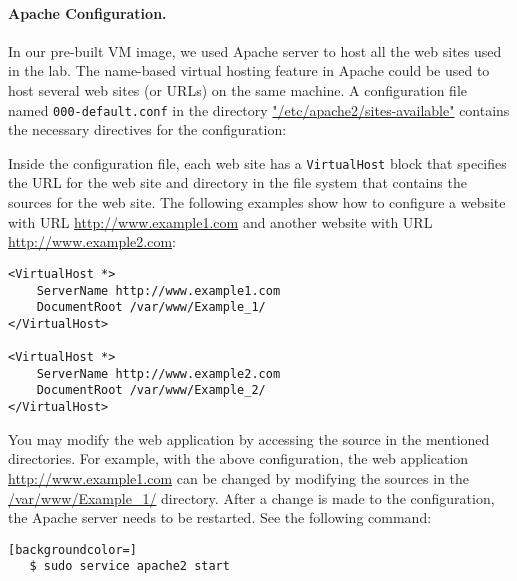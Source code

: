 
\paragraph{Apache Configuration.}
In our pre-built VM image, we used Apache server to host all the web
sites used in the lab. The name-based virtual hosting feature in
Apache could be used to host several web sites (or URLs) on the same
machine. A configuration file named \texttt{000-default.conf} in the directory
\url{"/etc/apache2/sites-available"} contains the necessary directives for the
configuration:

Inside the configuration file, each web site has a {\tt VirtualHost} block
that specifies the URL for the web site and directory in the file system
that contains the sources for the web site. The following examples show how
to configure a website with URL \url{http://www.example1.com} and another
website with URL \url{http://www.example2.com}:

\begin{lstlisting}
<VirtualHost *>
    ServerName http://www.example1.com
    DocumentRoot /var/www/Example_1/
</VirtualHost>

<VirtualHost *>
    ServerName http://www.example2.com
    DocumentRoot /var/www/Example_2/
</VirtualHost>
\end{lstlisting}


You may modify the web application by accessing the source in the
mentioned directories. For example, with the above configuration,
the web application \url{http://www.example1.com} can be changed by modifying
the sources in the \url{/var/www/Example_1/} directory. After a change is
made to the configuration, the Apache server needs to be restarted. See the
following command:

\begin{lstlisting}[backgroundcolor=]
   $ sudo service apache2 start
\end{lstlisting}

